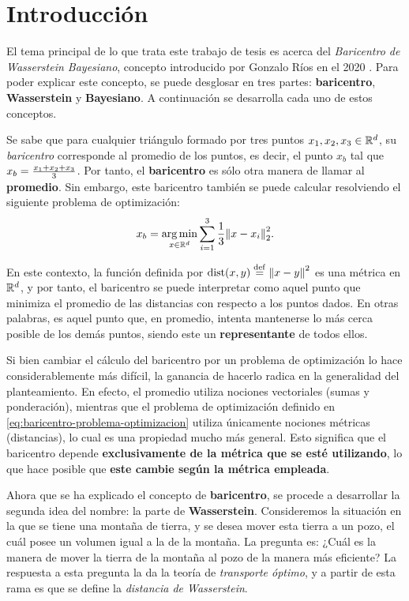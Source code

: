 \chapter{Introducción}

El tema principal de lo que trata este trabajo de tesis es acerca del \emph{Baricentro de Wasserstein Bayesiano}, concepto introducido por Gonzalo Ríos en el 2020 \cite{rios2020contributions}. Para poder explicar este concepto, se puede desglosar en tres partes: \textbf{baricentro}, \textbf{Wasserstein} y \textbf{Bayesiano}. A continuación se desarrolla cada uno de estos conceptos.

Se sabe que para cualquier triángulo formado por tres puntos $x_1, x_2, x_3 \in \mathbb{R}^d$, su \emph{baricentro} corresponde al promedio de los puntos, es decir, el punto $x_b$ tal que $x_b =\nolinebreak \frac{x_1 + x_2 + x_3}{3}$. Por tanto, el \textbf{baricentro} es sólo otra manera de llamar al \textbf{promedio}. Sin embargo, este baricentro también se puede calcular resolviendo el siguiente problema de optimización:
\begin{equation}\label{eq:baricentro-problema-optimizacion}
    x_b = \operatorname*{arg\,m{i}n}_{x \in \mathbb{R}^d} \sum_{i=1}^3 \frac{1}{3} \norm{x - x_i}_2^2.
\end{equation}

En este contexto, la función definida por $\operatorname{dist}(x, y) \stackrel{\mathrm{def}}{=} \norm{x - y}^2$ es una métrica en $\mathbb{R}^d$, y por tanto, el baricentro se puede interpretar como aquel punto que minimiza el promedio de las distancias con respecto a los puntos dados. En otras palabras, es aquel punto que, en promedio, intenta mantenerse lo más cerca posible de los demás puntos, siendo este un \textbf{representante} de todos ellos.

Si bien cambiar el cálculo del baricentro por un problema de optimización lo hace considerablemente más difícil, la ganancia de hacerlo radica en la generalidad del planteamiento. En efecto, el promedio utiliza nociones vectoriales (sumas y ponderación), mientras que el problema de optimización definido en \eqref{eq:baricentro-problema-optimizacion} utiliza únicamente nociones métricas (distancias), lo cual es una propiedad mucho más general. Esto significa que el baricentro depende \textbf{exclusivamente de la métrica que se esté utilizando}, lo que hace posible que \textbf{este cambie según la métrica empleada}.

Ahora que se ha explicado el concepto de \textbf{baricentro}, se procede a desarrollar la segunda idea del nombre: la parte de \textbf{Wasserstein}. Consideremos la situación en la que se tiene una montaña de tierra, y se desea mover esta tierra a un pozo, el cuál posee un volumen igual a la de la montaña. La pregunta es: ¿Cuál es la manera de mover la tierra de la montaña al pozo de la manera más eficiente? La respuesta a esta pregunta la da la teoría de \emph{transporte óptimo}, y a partir de esta rama es que se define la \emph{distancia de Wasserstein}.

